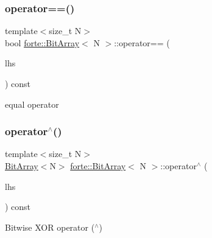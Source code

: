 \subsubsection{\texorpdfstring{operator==()}{operator==()}}
{\footnotesize\ttfamily template$<$size\+\_\+t N$>$ \\
bool \mbox{\hyperlink{classforte_1_1_bit_array}{forte\+::\+Bit\+Array}}$<$ N $>$\+::operator== (\begin{DoxyParamCaption}\item[{const \mbox{\hyperlink{classforte_1_1_bit_array}{Bit\+Array}}$<$ N $>$ \&}]{lhs }\end{DoxyParamCaption}) const\hspace{0.3cm}{\ttfamily [inline]}}



equal operator 

\mbox{\label{classforte_1_1_bit_array_a3ec375f1cffe72e1e4a737ebc3e4880e}} 
\subsubsection{\texorpdfstring{operator$^\wedge$()}{operator^()}}
{\footnotesize\ttfamily template$<$size\+\_\+t N$>$ \\
\mbox{\hyperlink{classforte_1_1_bit_array}{Bit\+Array}}$<$N$>$ \mbox{\hyperlink{classforte_1_1_bit_array}{forte\+::\+Bit\+Array}}$<$ N $>$\+::operator$^\wedge$ (\begin{DoxyParamCaption}\item[{const \mbox{\hyperlink{classforte_1_1_bit_array}{Bit\+Array}}$<$ N $>$ \&}]{lhs }\end{DoxyParamCaption}) const\hspace{0.3cm}{\ttfamily [inline]}}



Bitwise X\+OR operator ($^\wedge$) 

\mbox{\label{classforte_1_1_bit_array_a320cbd761b032de5797b95a08d27ac2f}} 
